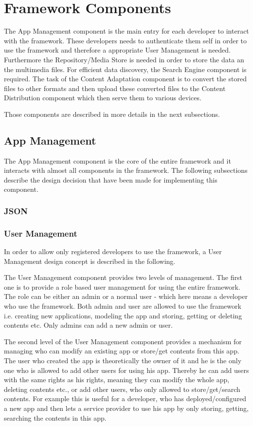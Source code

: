 \section{Framework Components\label{sec:des_com}}
The App Management component is the main entry for each developer to interact with the framework. These developers needs to authenticate them self in order to use the framework and therefore a appropriate User Management is needed. Furthermore the Repository/Media Store is needed in order to store the data an the multimedia files. For efficient data discovery, the Search Engine component  is required. The task of the Content Adaptation component is to convert the stored files to other formats and then upload these converted files to the Content Distribution component which then serve them to various devices.

Those components are described in more details in the next subsections.
 
\subsection{App Management\label{sec:des_repo}}

The App Management component is the core of the entire framework and it interacts with almost all components in the framework. The following subsections describe the design decision that have been made for implementing this component.

\subsubsection{JSON}
\subsubsection{User Management}
In order to allow only registered developers to use the framework, a User Management design concept is described in the following.

The User Management component provides two levels of management. The first one is to provide a role based user management for using the entire framework. The role can be either an admin or a normal user - which here means a developer who use the framework. Both admin and user are allowed to use the framework i.e. creating new applications, modeling the app and storing, getting or deleting contents etc. Only admins can add a new admin or user.

The second level of the User Management component provides a mechanism for managing who can modify an existing app or store/get contents from this app. The user who created the app is theoretically the owner of it and he is the only one who is allowed to add other users for using his app. Thereby he can add users with the same rights as his rights, meaning they can modify the whole app, deleting contents etc., or add other users, who only allowed to store/get/search contents. For example this is useful for a developer, who has deployed/configured a new app and then lets a service provider to use his app by only storing, getting, searching the contents in this app. 

